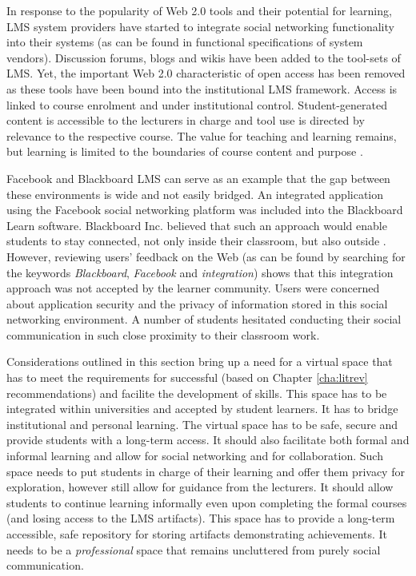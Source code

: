 In response to the popularity of Web 2.0 tools and their potential for learning,
LMS system providers have started to integrate social networking functionality
into their systems (as can be found in functional specifications of system
vendors). Discussion forums, blogs and wikis have been added to the tool-sets of
LMS. Yet, the important Web 2.0 characteristic of open access has been removed
as these tools have been bound into the institutional LMS framework. Access is
linked to course enrolment and under institutional control. Student-generated
content is accessible to the lecturers in charge and tool use is directed by
relevance to the respective course. The value for teaching and learning remains,
but learning is limited to the boundaries of course content and purpose
\citep{Mott2010}.

Facebook and Blackboard LMS can serve as an example that the gap between
these environments is wide and not easily bridged. An integrated application
using the Facebook social networking platform was included into the Blackboard
Learn software. Blackboard Inc. believed that such an approach would enable
students to stay connected, not only inside their classroom, but also outside
\citep{BlackboardInc.2009}. However, reviewing users' feedback on the Web (as
can be found by searching for the keywords \textit{Blackboard},
\textit{Facebook} and \textit{integration}) shows that this integration approach
was not accepted by the learner community. Users were concerned about
application security and the privacy of information stored in this social
networking environment. A number of students hesitated conducting their social
communication in such close proximity to their classroom work. 

Considerations outlined in this section bring up a need for a virtual space that
has to meet the requirements for successful \LLLs (based on Chapter
\ref{cha:litrev} recommendations) and facilite the development of \LLLs skills.
This space has to be integrated within universities and accepted by student
learners. It has to bridge institutional and personal learning. The virtual
space has to be safe, secure and provide students with a long-term access. It
should also facilitate both formal and informal learning and allow for social
networking and for collaboration. Such space needs to put students in charge of
their learning and offer them privacy for exploration, however still allow
for guidance from the lecturers. It should allow students to continue learning
informally even upon completing the formal courses (and losing access to the
LMS artifacts). This space has to provide a long-term accessible, safe
repository for storing artifacts demonstrating achievements. It needs to be a
\textit{professional} space that remains uncluttered from purely social
communication.

